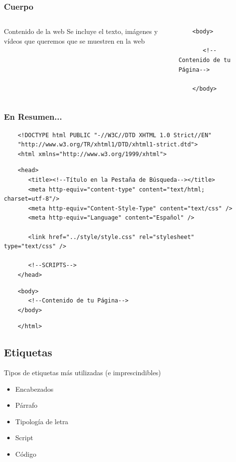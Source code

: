 \documentclass{beamer}
\begin{document}
\begin{frame}[fragile] %
\frametitle{Cuerpo}
	\begin{columns}[c]
	\begin{block}{Contenido de la web}
	Se incluye el texto, imágenes y vídeos que queremos que se muestren en la web
	\end{block}
	
	\scriptsize{
	\begin{verbatim}
	<body>
	
	   <!--Contenido de tu Página-->
	   
	</body>
	\end{verbatim}
	}
	\end{columns}
\end{frame}

\begin{frame}[fragile] %
\frametitle{En Resumen...}
	\scriptsize{
	\begin{verbatim}
	<!DOCTYPE html PUBLIC "-//W3C//DTD XHTML 1.0 Strict//EN"
	"http://www.w3.org/TR/xhtml1/DTD/xhtml1-strict.dtd">
	<html xmlns="http://www.w3.org/1999/xhtml">
	\end{verbatim}
	\pause
	\begin{verbatim}
	<head>
	   <title><!--Título en la Pestaña de Búsqueda--></title>
	   <meta http-equiv="content-type" content="text/html; charset=utf-8"/>
	   <meta http-equiv="Content-Style-Type" content="text/css" />
	   <meta http-equiv="Language" content="Español" />

	   <link href="../style/style.css" rel="stylesheet" type="text/css" />
	
	   <!--SCRIPTS-->
	</head>
	\end{verbatim}
	\pause
	\begin{verbatim}
	<body>
	   <!--Contenido de tu Página-->
	</body>
	\end{verbatim}
	\pause
	\begin{verbatim}
	</html>	
	\end{verbatim}	
	}
\end{frame}

	\subsection{Etiquetas}
\begin{frame}
	\begin{block}{Tipos de etiquetas más utilizadas (e imprescindibles)}
		\begin{itemize}
		\item Encabezados
		\item Párrafo
		\item Tipología de letra
		\item Script
		\item Código
		\end{itemize}
	\end{block}
\end{frame}
\end{document}
